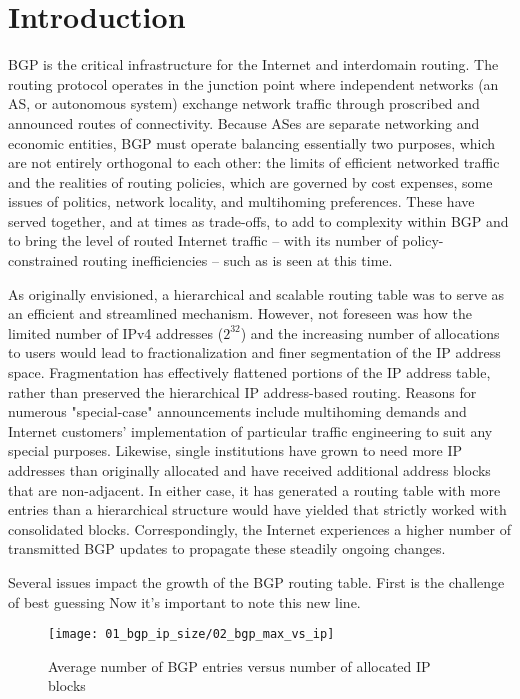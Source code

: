 \section{Introduction}

BGP is the critical infrastructure for the Internet and interdomain routing.  The routing protocol operates in the junction point where independent networks (an AS, or autonomous system) exchange network traffic through proscribed and announced routes of connectivity.  Because ASes are separate networking and economic entities, BGP must operate balancing essentially two purposes, which are not entirely orthogonal to each other: the limits of efficient networked traffic and the realities of routing policies, which are governed by cost expenses, some issues of politics, network locality, and multihoming preferences.  These have served together, and at times as trade-offs, to add to complexity within BGP and to bring the level of routed Internet traffic -- with its number of policy-constrained routing inefficiencies -- such as is seen at this time.

As originally envisioned, a hierarchical and scalable routing table was to serve as an efficient and streamlined mechanism.  However, not foreseen was how the limited number of IPv4 addresses ($2^{32}$) and the increasing number of allocations to users would lead to fractionalization and finer segmentation of the IP address space.  Fragmentation has effectively flattened portions of the IP address table, rather than preserved the hierarchical IP address-based routing.  Reasons for numerous "special-case" announcements include multihoming demands and Internet customers' implementation of particular traffic engineering to suit any special purposes.  Likewise, single institutions have grown to need more IP addresses than originally allocated and have received additional address blocks that are non-adjacent.  In either case, it has generated a routing table with more entries than a hierarchical structure would have yielded that strictly worked with consolidated blocks.  Correspondingly, the Internet experiences a higher number of transmitted BGP updates to propagate these steadily ongoing changes.

Several issues impact the growth of the BGP routing table.  First is the challenge of best guessing
Now it's important to note this new line.

\begin{figure}[htbp]
	\centering
		\texttt{[image: 01\_bgp\_ip\_size/02\_bgp\_max\_vs\_ip]}
	\caption{Average number of BGP entries versus number of allocated IP blocks}
	\label{fig:BGP vs RIR}
\end{figure}

